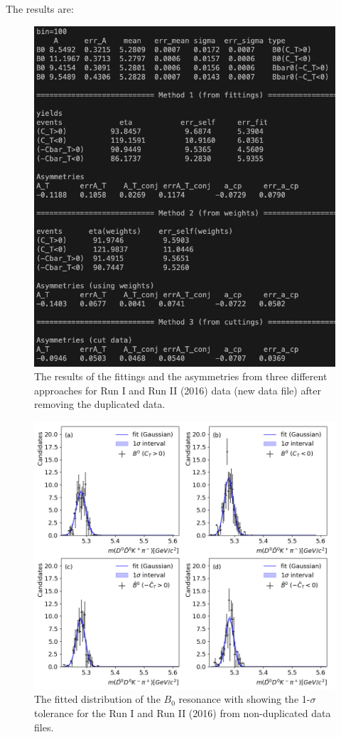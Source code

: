 The results are:
\begin{figure}[h]
\center
\includegraphics*[width=0.76\linewidth]{LHCb_Run1_AND_2/B0_yields_asy_new_noduplicated}
\caption{The results of the fittings and the asymmetries from three different approaches for Run I and Run II (2016) data (new data file) after removing the duplicated data.}
\label{B0_yields_asy_new_run12_noduplicated}
\end{figure}
\begin{figure}[h]
\center
\includegraphics*[width=0.76\linewidth]{LHCb_Run1_AND_2/invmass_B0_fit_tp_nondup}
\caption{The fitted distribution of the $B_0$ resonance with showing the 1-$\sigma$ tolerance for the Run I and Run II  (2016) from non-duplicated data files.}
\label{fit_B0_run12}
\end{figure}
